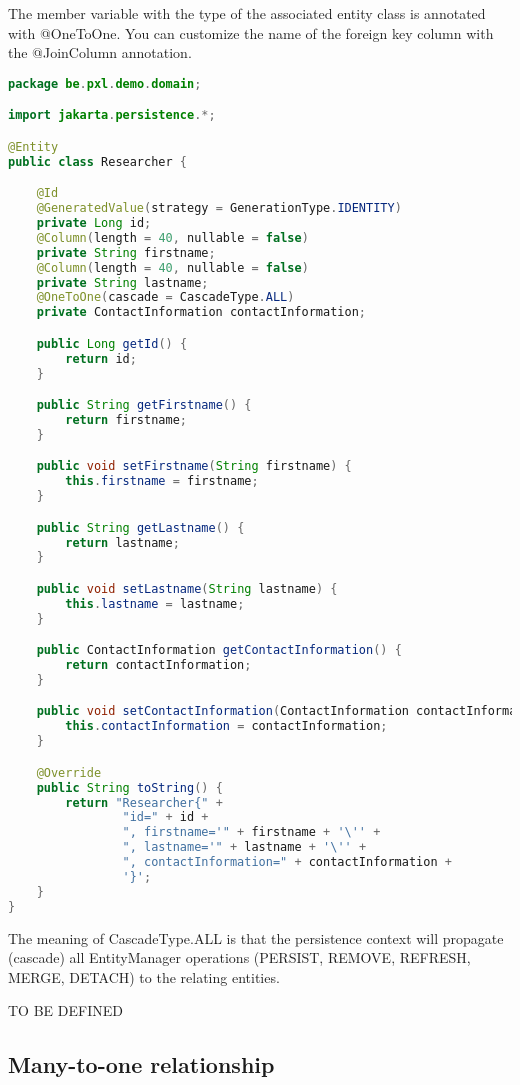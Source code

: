 The member variable with the type of the associated entity class is annotated with @OneToOne. You can customize the name of the foreign key column with the @JoinColumn annotation.

\begin{lstlisting}[frame=single, language=java]
package be.pxl.demo.domain;

import jakarta.persistence.*;

@Entity
public class Researcher {

	@Id
	@GeneratedValue(strategy = GenerationType.IDENTITY)
	private Long id;
	@Column(length = 40, nullable = false)
	private String firstname;
	@Column(length = 40, nullable = false)
	private String lastname;
	@OneToOne(cascade = CascadeType.ALL)
	private ContactInformation contactInformation;

	public Long getId() {
		return id;
	}

	public String getFirstname() {
		return firstname;
	}

	public void setFirstname(String firstname) {
		this.firstname = firstname;
	}

	public String getLastname() {
		return lastname;
	}

	public void setLastname(String lastname) {
		this.lastname = lastname;
	}

	public ContactInformation getContactInformation() {
		return contactInformation;
	}

	public void setContactInformation(ContactInformation contactInformation) {
		this.contactInformation = contactInformation;
	}

	@Override
	public String toString() {
		return "Researcher{" +
				"id=" + id +
				", firstname='" + firstname + '\'' +
				", lastname='" + lastname + '\'' +
				", contactInformation=" + contactInformation +
				'}';
	}
}

\end{lstlisting}

The meaning of CascadeType.ALL is that the persistence context will propagate (cascade) all EntityManager operations (PERSIST, REMOVE, REFRESH, MERGE, DETACH) to the relating entities.

\begin{oefening}
TO BE DEFINED 
\end{oefening}

\subsection{Many-to-one relationship}

